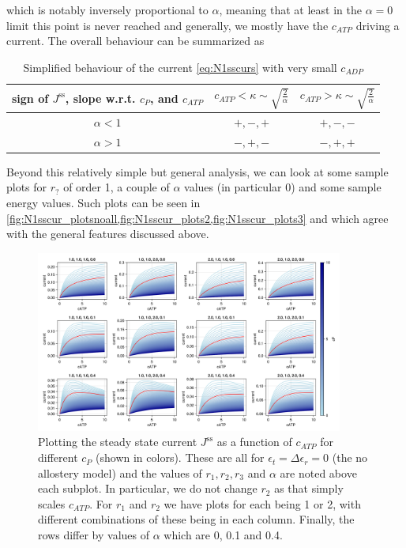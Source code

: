 \documentclass[11pt]{article}
\begin{document}
which is notably inversely proportional to $\alpha$, meaning that at least in the $\alpha=0$ limit this point is never reached and generally, we mostly have the $c_{ATP}$ driving a current.
The overall behaviour can be summarized as
\begin{tcolorbox}
	\begin{table}[H]
		\centering
		\begin{tabular}{c|c|c}
			sign of $J^\text{ss}$, slope w.r.t. $c_P$, and $c_{ATP}$ & $c_{ATP} < \kappa \sim \sqrt{\frac{2}{\alpha}}$ & $c_{ATP} > \kappa \sim \sqrt{\frac{2}{\alpha}}$ \\
			\hline
			$\alpha < 1$                                             & $+,-,+$                                         & $+,-,-$                                         \\
			$\alpha > 1$                                             & $-,+,-$                                         & $-,+,+$                                         \\
		\end{tabular}
		\caption{Simplified behaviour of the current \cref{eq:N1sscurs} with very small $c_{ADP}$}
	\end{table}
\end{tcolorbox}

Beyond this relatively simple but general analysis, we can look at some sample plots for $r_?$ of order 1, a couple of $\alpha$ values (in particular 0) and some sample energy values.
Such plots can be seen in \cref{fig:N1sscur_plotsnoall,fig:N1sscur_plots2,fig:N1sscur_plots3} and which agree with the general features discussed above.

\begin{figure}[H]
	\centering
	\includegraphics[width=0.9\textwidth]{../../plots/N1sym/sscurs_noallos.png}
	\caption{
		Plotting the steady state current $J^\text{ss}$ as a function of $c_{ATP}$ for different $c_P$ (shown in colors).
		These are all for $\epsilon_t=\Delta\epsilon_r=0$ (the no allostery model) and the values of $r_1,r_2,r_3$ and $\alpha$ are noted above each subplot.
		In particular, we do not change $r_2$ as that simply scales $c_{ATP}$.
		For $r_1$ and $r_2$ we have plots for each being 1 or 2, with different combinations of these being in each column.
		Finally, the rows differ by values of $\alpha$ which are 0, 0.1 and 0.4.
	}\label{fig:N1sscur_plotsnoall}
\end{figure}
\end{document}
